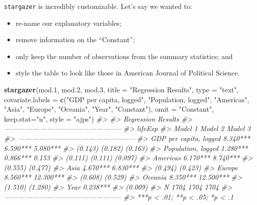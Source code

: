 \documentclass[]{book}
\newenvironment{Shaded}{\begin{snugshade}}{\end{snugshade}}
\newcommand{\CommentTok}[1]{\textcolor[rgb]{0.56,0.35,0.01}{\textit{#1}}}
\newcommand{\DataTypeTok}[1]{\textcolor[rgb]{0.13,0.29,0.53}{#1}}
\newcommand{\FloatTok}[1]{\textcolor[rgb]{0.00,0.00,0.81}{#1}}
\newcommand{\KeywordTok}[1]{\textcolor[rgb]{0.13,0.29,0.53}{\textbf{#1}}}
\newcommand{\NormalTok}[1]{#1}
\newcommand{\StringTok}[1]{\textcolor[rgb]{0.31,0.60,0.02}{#1}}
\providecommand{\tightlist}{%
  \setlength{\itemsep}{0pt}\setlength{\parskip}{0pt}}
\begin{document}
\texttt{stargazer} is incredibly customizable. Let's say we wanted to:

\begin{itemize}
\tightlist
\item
  re-name our explanatory variables;
\item
  remove information on the ``Constant'';\\
\item
  only keep the number of observations from the summary statistics; and
\item
  style the table to look like those in American Journal of Political Science.
\end{itemize}

\begin{Shaded}
\begin{Highlighting}[]
\KeywordTok{stargazer}\NormalTok{(mod}\FloatTok{.1}\NormalTok{, mod}\FloatTok{.2}\NormalTok{, mod}\FloatTok{.3}\NormalTok{, }\DataTypeTok{title =} \StringTok{"Regression Results"}\NormalTok{, }\DataTypeTok{type =} \StringTok{"text"}\NormalTok{, }
          \DataTypeTok{covariate.labels  =} \KeywordTok{c}\NormalTok{(}\StringTok{"GDP per capita, logged"}\NormalTok{, }\StringTok{"Population, logged"}\NormalTok{, }\StringTok{"Americas"}\NormalTok{, }\StringTok{"Asia"}\NormalTok{, }\StringTok{"Europe"}\NormalTok{, }\StringTok{"Oceania"}\NormalTok{, }\StringTok{"Year"}\NormalTok{, }\StringTok{"Constant"}\NormalTok{), }
          \DataTypeTok{omit =} \StringTok{"Constant"}\NormalTok{, }
          \DataTypeTok{keep.stat=}\StringTok{"n"}\NormalTok{, }\DataTypeTok{style =} \StringTok{"ajps"}\NormalTok{)}
\CommentTok{#> }
\CommentTok{#> Regression Results}
\CommentTok{#> --------------------------------------------------}
\CommentTok{#>                                  lifeExp          }
\CommentTok{#>                        Model 1  Model 2   Model 3 }
\CommentTok{#> --------------------------------------------------}
\CommentTok{#> GDP per capita, logged 8.340*** 6.590*** 5.080*** }
\CommentTok{#>                        (0.143)  (0.182)   (0.163) }
\CommentTok{#> Population, logged     1.280*** 0.866***   0.153  }
\CommentTok{#>                        (0.111)  (0.111)   (0.097) }
\CommentTok{#> Americas                        6.170*** 8.740*** }
\CommentTok{#>                                 (0.555)   (0.477) }
\CommentTok{#> Asia                            4.670*** 6.830*** }
\CommentTok{#>                                 (0.494)   (0.423) }
\CommentTok{#> Europe                          8.560*** 12.300***}
\CommentTok{#>                                 (0.608)   (0.529) }
\CommentTok{#> Oceania                         8.350*** 12.500***}
\CommentTok{#>                                 (1.510)   (1.280) }
\CommentTok{#> Year                                     0.238*** }
\CommentTok{#>                                           (0.009) }
\CommentTok{#> N                        1704     1704     1704   }
\CommentTok{#> --------------------------------------------------}
\CommentTok{#> ***p < .01; **p < .05; *p < .1}
\end{Highlighting}
\end{Shaded}
\end{document}
